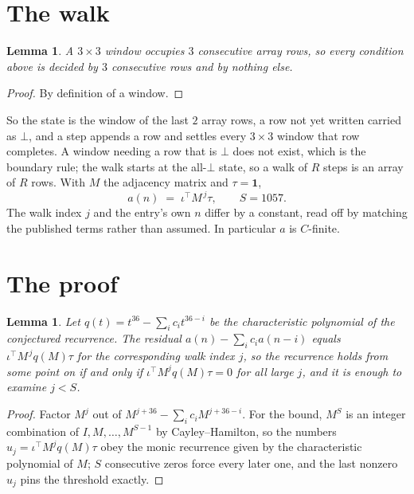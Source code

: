 \documentclass[11pt,a4paper]{article}
\theoremstyle{plain}
\newtheorem{lemma}[theorem]{Lemma}
\theoremstyle{definition}
\begin{document}
\section{The walk}

\begin{lemma}\label{lem:win}
A $3\times3$ window occupies $3$ consecutive array rows, so every condition above is
decided by $3$ consecutive rows and by nothing else.
\end{lemma}

\begin{proof}
By definition of a window.
\end{proof}

So the state is the window of the last $2$ array rows, a row not yet written carried as
$\bot$, and a step appends a row and settles every $3\times3$ window that row completes. A
window needing a row that is $\bot$ does not exist, which is the boundary rule; the walk starts
at the all-$\bot$ state, so a walk of $R$ steps is an array of $R$ rows. With $M$ the adjacency
matrix and $\tau=\mathbf{1}$,
\[
a(n)\;=\;\iota^{\!\top}M^{\,j}\tau ,\qquad S=1057.
\]
The walk index $j$ and the entry's own $n$ differ by a constant, read off by matching the
published terms rather than assumed. In particular $a$ is $C$-finite.

\section{The proof}

\begin{lemma}\label{lem:crit}
Let $q(t)=t^{36}-\sum_i c_it^{36-i}$ be the characteristic polynomial of the
conjectured recurrence. The residual $a(n)-\sum_ic_ia(n-i)$ equals
$\iota^{\!\top}M^{\,j}q(M)\tau$ for the corresponding walk index $j$, so the recurrence
holds from some point on if and only if $\iota^{\!\top}M^{j}q(M)\tau=0$ for all large $j$,
and it is enough to examine $j<S$.
\end{lemma}

\begin{proof}
Factor $M^{j}$ out of $M^{j+36}-\sum_ic_iM^{j+36-i}$. For the bound, $M^{S}$
is an integer combination of $I,M,\dots,M^{S-1}$ by Cayley--Hamilton, so the numbers
$u_j=\iota^{\!\top}M^{j}q(M)\tau$ obey the monic recurrence given by the characteristic
polynomial of $M$; $S$ consecutive zeros force every later one, and the last nonzero $u_j$
pins the threshold exactly.
\end{proof}
\end{document}
